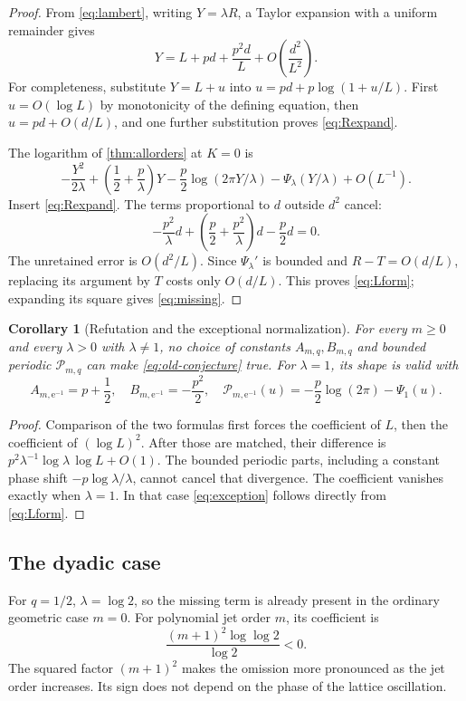 \documentclass[11pt,a4paper]{article}
\numberwithin{equation}{section}
\newtheorem{corollary}[theorem]{Corollary}
\theoremstyle{definition}
\newcommand{\ee}{\mathrm e}
\begin{document}
\begin{proof}
From \eqref{eq:lambert}, writing $Y=\lambda R$, a Taylor expansion with a uniform remainder gives
\begin{equation}
 Y=L+pd+\frac{p^2d}{L}+O\left(\frac{d^2}{L^2}\right).
 \label{eq:Rexpand}
\end{equation}
For completeness, substitute $Y=L+u$ into
$u=pd+p\log(1+u/L)$. First $u=O(\log L)$ by monotonicity of the defining equation, then $u=pd+O(d/L)$, and one further substitution proves \eqref{eq:Rexpand}.

The logarithm of \cref{thm:allorders} at $K=0$ is
\[
 -\frac{Y^2}{2\lambda}+
 \left(\frac12+\frac p\lambda\right)Y
 -\frac p2\log(2\pi Y/\lambda)-\Psi_\lambda(Y/\lambda)+O(L^{-1}).
\]
Insert \eqref{eq:Rexpand}. The terms proportional to $d$ outside $d^2$ cancel:
\[
 -\frac{p^2}{\lambda}d+
 \left(\frac p2+\frac{p^2}{\lambda}\right)d-\frac p2d=0.
\]
The unretained error is $O(d^2/L)$. Since $\Psi_\lambda'$ is bounded and
$R-T=O(d/L)$, replacing its argument by $T$ costs only $O(d/L)$.
This proves \eqref{eq:Lform}; expanding its square gives \eqref{eq:missing}.
\end{proof}

\begin{corollary}[Refutation and the exceptional normalization]
\label{cor:refutation}
For every $m\geq0$ and every $\lambda>0$ with $\lambda\ne1$, no choice of constants $A_{m,q},B_{m,q}$ and bounded periodic $\mathcal P_{m,q}$ can make \eqref{eq:old-conjecture} true. For $\lambda=1$, its shape is valid with
\begin{equation}
 A_{m,\ee^{-1}}=p+\frac12,\quad
 B_{m,\ee^{-1}}=-\frac{p^2}{2},\quad
 \mathcal P_{m,\ee^{-1}}(u)=-\frac p2\log(2\pi)-\Psi_1(u).
 \label{eq:exception}
\end{equation}
\end{corollary}

\begin{proof}
Comparison of the two formulas first forces the coefficient of $L$, then the coefficient of $(\log L)^2$. After those are matched, their difference is
$p^2\lambda^{-1}\log\lambda\,\log L+O(1)$. The bounded periodic parts, including a constant phase shift $-p\log\lambda/\lambda$, cannot cancel that divergence. The coefficient vanishes exactly when $\lambda=1$. In that case \eqref{eq:exception} follows directly from \eqref{eq:Lform}.
\end{proof}

\subsection{The dyadic case}
For $q=1/2$, $\lambda=\log2$, so the missing term is already present in the ordinary geometric case $m=0$. For polynomial jet order $m$, its coefficient is
\[
 \frac{(m+1)^2\log\log2}{\log2}<0.
\]
The squared factor $(m+1)^2$ makes the omission more pronounced as the jet order increases. Its sign does not depend on the phase of the lattice oscillation.
\end{document}
